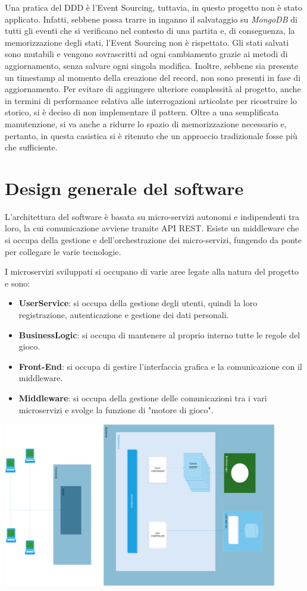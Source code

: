 Una pratica del DDD è l'Event Sourcing, tuttavia, in questo progetto non è stato applicato.
Infatti, sebbene possa trarre in inganno il salvataggio su \textit{MongoDB} di tutti gli eventi che si
verificano nel contesto di una partita e, di conseguenza, la memorizzazione degli stati, 
l'Event Sourcing non è rispettato.
Gli stati salvati sono mutabili e vengono sovrascritti ad ogni cambiamento grazie ai metodi di
 aggiornamento, senza salvare ogni singola modifica. Inoltre, sebbene sia presente un timestamp al
 momento della creazione del record, non sono presenti in fase di aggiornamento.
Per evitare di aggiungere ulteriore complessità al progetto, anche in termini di performance relativa
alle interrogazioni articolate per ricostruire lo storico, si è deciso di non implementare il pattern.
Oltre a una semplificata manutenzione, si va anche a ridurre lo spazio di memorizzazione necessario e, pertanto,
in questa casistica si è ritenuto che un approccio tradizionale fosse più che sufficiente.  

\section{Design generale del software}

L'architettura del software è basata su micro-servizi autonomi e indipendenti tra loro, la cui comunicazione avviene tramite API REST.
Esiste un middleware che si occupa della gestione e dell'orchestrazione dei micro-servizi, fungendo da ponte per collegare le varie tecnologie.

I microservizi sviluppati si occupano di varie aree legate alla natura del progetto e sono:
\begin{itemize}
    \item \textbf{UserService}: si occupa della gestione degli utenti, quindi la loro registrazione, autenticazione e gestione dei dati personali.
    \item \textbf{BusinessLogic}: si occupa di mantenere al proprio interno tutte le regole del gioco.
    \item \textbf{Front-End}: si occupa di gestire l'interfaccia grafica e la comunicazione con il middleware.
    \item \textbf{Middleware}: si occupa della gestione delle comunicazioni tra i vari microservizi e svolge la funzione di "motore di gioco".
\end{itemize}

\includegraphics[width=12cm]{report/img/Architecture.png}\\[5.5cm]